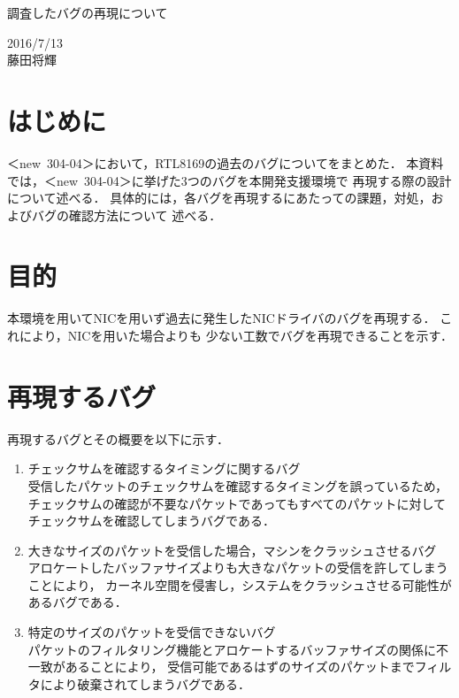 \documentclass[12pt]{jsarticle}
\begin{document}

\begin{center}
    {\LARGE 調査したバグの再現について}
\end{center}

\begin{flushright}
    2016/7/13\\
    藤田将輝
\end{flushright}
\section{はじめに}
\mbox{＜new 304-04＞}において，RTL8169の過去のバグについてをまとめた．
本資料では，\mbox{＜new 304-04＞}に挙げた3つのバグを本開発支援環境で
再現する際の設計について述べる．
具体的には，各バグを再現するにあたっての課題，対処，およびバグの確認方法について
述べる．

\section{目的}
本環境を用いてNICを用いず過去に発生したNICドライバのバグを再現する．
これにより，NICを用いた場合よりも
少ない工数でバグを再現できることを示す．

\section{再現するバグ}
再現するバグとその概要を以下に示す．
\begin{enumerate}
    \item チェックサムを確認するタイミングに関するバグ\\
        受信したパケットのチェックサムを確認するタイミングを誤っているため，
        チェックサムの確認が不要なパケットであってもすべてのパケットに対して
        チェックサムを確認してしまうバグである．
    \item 大きなサイズのパケットを受信した場合，マシンをクラッシュさせるバグ\\
        アロケートしたバッファサイズよりも大きなパケットの受信を許してしまうことにより，
        カーネル空間を侵害し，システムをクラッシュさせる可能性があるバグである．
    \item 特定のサイズのパケットを受信できないバグ\\
        パケットのフィルタリング機能とアロケートするバッファサイズの関係に不一致があることにより，
        受信可能であるはずのサイズのパケットまでフィルタにより破棄されてしまうバグである．
\end{enumerate}
\end{document}
